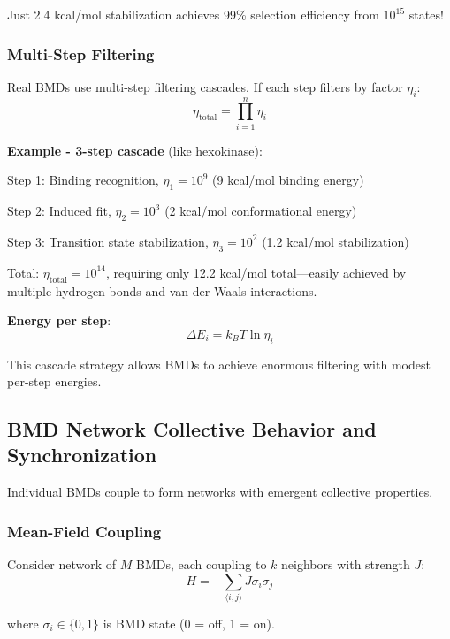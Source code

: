 \documentclass[11pt,onecolumn]{article}
\begin{document}
Just 2.4 kcal/mol stabilization achieves 99\% selection efficiency from $10^{15}$ states!

\subsubsection{Multi-Step Filtering}

Real BMDs use multi-step filtering cascades. If each step filters by factor $\eta_i$:
\begin{equation}
\eta_{\text{total}} = \prod_{i=1}^{n} \eta_i
\end{equation}

\textbf{Example - 3-step cascade} (like hexokinase):

Step 1: Binding recognition, $\eta_1 = 10^9$ (9 kcal/mol binding energy)

Step 2: Induced fit, $\eta_2 = 10^3$ (2 kcal/mol conformational energy)

Step 3: Transition state stabilization, $\eta_3 = 10^2$ (1.2 kcal/mol stabilization)

Total: $\eta_{\text{total}} = 10^{14}$, requiring only 12.2 kcal/mol total---easily achieved by multiple hydrogen bonds and van der Waals interactions.

\textbf{Energy per step}:
\begin{equation}
\Delta E_i = k_B T \ln \eta_i
\end{equation}

This cascade strategy allows BMDs to achieve enormous filtering with modest per-step energies.

\subsection{BMD Network Collective Behavior and Synchronization}

Individual BMDs couple to form networks with emergent collective properties.

\subsubsection{Mean-Field Coupling}

Consider network of $M$ BMDs, each coupling to $k$ neighbors with strength $J$:
\begin{equation}
H = -\sum_{\langle i,j \rangle} J \sigma_i \sigma_j
\end{equation}

where $\sigma_i \in \{0,1\}$ is BMD state (0 = off, 1 = on).
\end{document}
